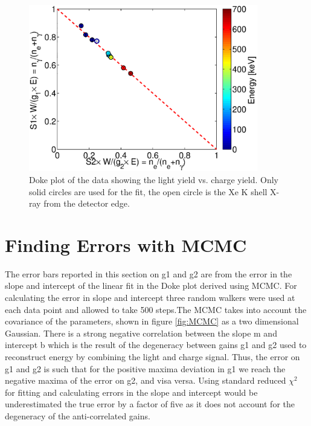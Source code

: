  \begin{figure}[h!]\centering
\includegraphics[width=100mm]{Chapter_E_Scale/Figures/S1S2_Doke2_3.eps}
\caption{Doke plot of the data showing the light yield vs. charge yield. Only solid circles are used for the fit, the open circle is the Xe K shell X-ray from the detector edge.}
\label{fig:Doke_E}
\end{figure}

\newpage

\section{Finding Errors with MCMC}
\label{sec:MCMC}
The error bars reported in this section on g1 and g2 are from the error in the slope and intercept of the linear fit in the Doke plot derived using MCMC. For calculating the error in slope and intercept  three random walkers were used at each data point and allowed to take 500 steps.The MCMC takes into account the covariance of the parameters, shown in figure \ref{fig:MCMC} as a two dimensional Gaussian. There is a strong negative correlation between the slope m and intercept b which is the result of the degeneracy between gains g1 and g2 used to reconstruct energy by combining the light and charge signal. Thus, the error on g1 and g2 is such that for the positive maxima deviation in g1 we reach the negative maxima of the error on g2, and visa versa. Using standard reduced $\chi^2$ for fitting and calculating errors in the slope and intercept would be underestimated the true error by a factor of five as it does not account for the degeneracy of the anti-correlated gains. 



